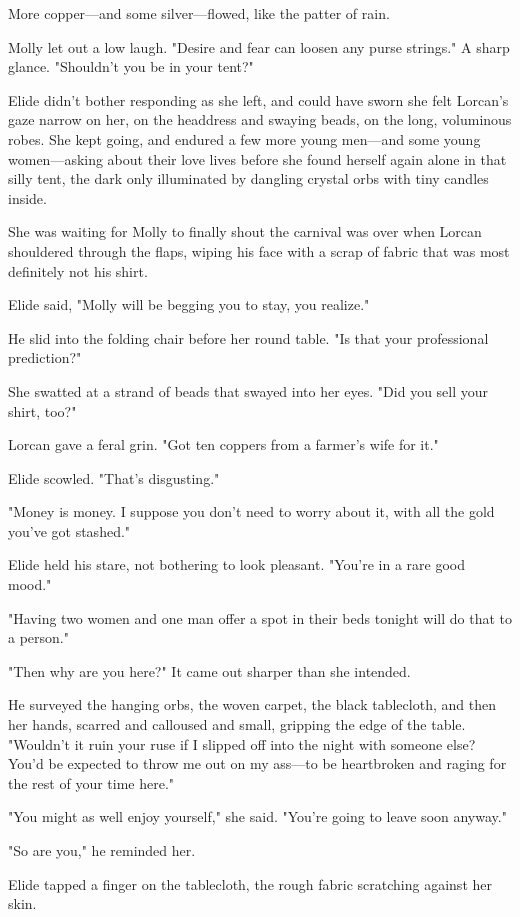 More copper---and some silver---flowed, like the patter of rain.

Molly let out a low laugh. "Desire and fear can loosen any purse strings." A sharp glance. "Shouldn't you be in your tent?"

Elide didn't bother responding as she left, and could have sworn she felt Lorcan's gaze narrow on her, on the headdress and swaying beads, on the long, voluminous robes. She kept going, and endured a few more young men---and some young women---asking about their love lives before she found herself again alone in that silly tent, the dark only illuminated by dangling crystal orbs with tiny candles inside.

She was waiting for Molly to finally shout the carnival was over when Lorcan shouldered through the flaps, wiping his face with a scrap of fabric that was most definitely not his shirt.

Elide said, "Molly will be begging you to stay, you realize."

He slid into the folding chair before her round table. "Is that your professional prediction?"

She swatted at a strand of beads that swayed into her eyes. "Did you sell your shirt, too?"

Lorcan gave a feral grin. "Got ten coppers from a farmer's wife for it."

Elide scowled. "That's disgusting."

"Money is money. I suppose you don't need to worry about it, with all the gold you've got stashed."

Elide held his stare, not bothering to look pleasant. "You're in a rare good mood."

"Having two women and one man offer a spot in their beds tonight will do that to a person."

"Then why are you here?" It came out sharper than she intended.

He surveyed the hanging orbs, the woven carpet, the black tablecloth, and then her hands, scarred and calloused and small, gripping the edge of the table. "Wouldn't it ruin your ruse if I slipped off into the night with someone else? You'd be expected to throw me out on my ass---to be heartbroken and raging for the rest of your time here."

"You might as well enjoy yourself," she said. "You're going to leave soon anyway."

"So are you," he reminded her.

Elide tapped a finger on the tablecloth, the rough fabric scratching against her skin.

